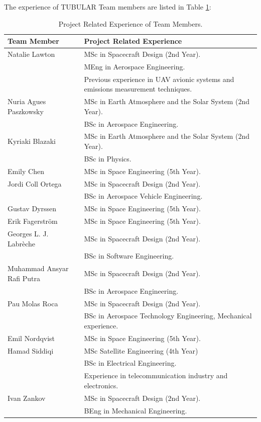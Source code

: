 \documentclass[a4paper,12pt,oneside]{article}
\begin{document}
The experience of TUBULAR Team members are listed in Table \ref{tab:team-member-experience}:

\begin{table}[H]
\centering
\begin{tabular}{|l|m{11cm}|}
\hline
\textbf{Team Member} & \textbf{Project Related Experience} \\ \hline
Natalie Lawton & MSc in Spacecraft Design (2nd Year). \\& MEng in Aerospace Engineering.\\& Previous experience in UAV avionic systems and emissions measurement techniques. \\ \hline
Nuria Agues Paszkowsky & MSc in Earth Atmosphere and the Solar System (2nd Year). \\& BSc in Aerospace Engineering.\\ \hline
Kyriaki Blazaki & MSc in Earth Atmosphere and the Solar System (2nd Year). \\& BSc in Physics. \\ \hline
Emily Chen & MSc in Space Engineering (5th Year). \\ \hline
Jordi Coll Ortega & MSc in Spacecraft Design (2nd Year). \\& BSc in Aerospace Vehicle Engineering. \\ \hline
Gustav Dyrssen &  MSc in Space Engineering (5th Year).\\ \hline
Erik Fagerström & MSc in Space Engineering (5th Year). \\ \hline
Georges L. J. Labrèche & MSc in Spacecraft Design (2nd Year). \\& BSc in Software Engineering.\\ \hline
Muhammad Ansyar Rafi Putra & MSc in Spacecraft Design (2nd Year). \\& BSc in Aerospace Engineering. \\ \hline
Pau Molas Roca & MSc in Spacecraft Design (2nd Year). \\& BSc in Aerospace Technology Engineering, Mechanical experience. \\ \hline
Emil Nordqvist & MSc in Space Engineering (5th Year). \\ \hline
Hamad Siddiqi & MSc Satellite Engineering (4th Year) \\&  BSc in Electrical Engineering.\\& Experience in telecommunication industry and electronics.  \\ \hline
Ivan Zankov & MSc in Spacecraft Design (2nd Year). \\& BEng in Mechanical Engineering.\\ \hline
\end{tabular}
\caption{Project Related Experience of Team Members.}
\label{tab:team-member-experience}
\end{table}
\raggedbottom
\end{document}
